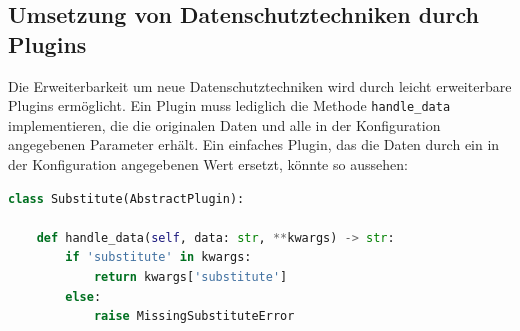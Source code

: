 \subsection{Umsetzung von Datenschutztechniken durch Plugins}

Die Erweiterbarkeit um neue Datenschutztechniken wird durch leicht erweiterbare Plugins ermöglicht. Ein Plugin muss lediglich die Methode \texttt{handle\_data} implementieren, die die originalen Daten und alle in der Konfiguration angegebenen Parameter erhält. Ein einfaches Plugin, das die Daten durch ein in der Konfiguration angegebenen Wert ersetzt, könnte so aussehen:

\begin{lstlisting}[language=Python]
class Substitute(AbstractPlugin):

    def handle_data(self, data: str, **kwargs) -> str:
        if 'substitute' in kwargs:
            return kwargs['substitute']
        else:
            raise MissingSubstituteError
\end{lstlisting}